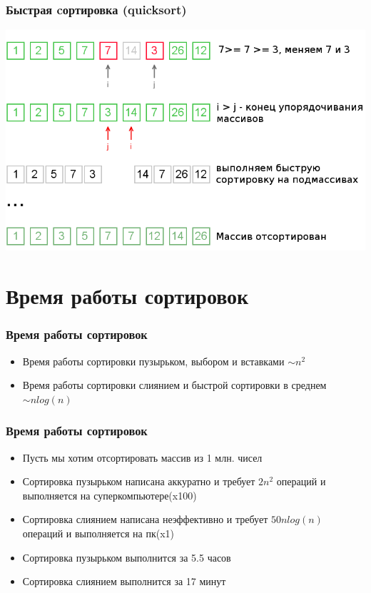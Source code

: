 \documentclass[12pt,pdf,hyperref={unicode}]{beamer}
\begin{document}
\begin{frame}[fragile]
\frametitle{Быстрая cортировка (quicksort)} 
\begin{center}
\includegraphics[width=0.9\linewidth]{images/qs2.png}
\end{center}
\end{frame}


\section{Время работы сортировок}

\begin{frame}[fragile]
\frametitle{Время работы сортировок} 
\begin{itemize}
\item Время работы сортировки пузырьком, выбором и вставками $\sim n^2$ \\
\item Время работы сортировки слиянием и быстрой сортировки в среднем $\sim n log(n)$ \\
\end{itemize}
\end{frame}

\begin{frame}[fragile]
\frametitle{Время работы сортировок} 
\begin{itemize}
\item Пусть мы хотим отсортировать массив из 1 млн. чисел
\item Сортировка пузырьком написана аккуратно и требует $2n^2$ операций и выполняется на суперкомпьютере(x100)
\item Сортировка слиянием написана неэффективно и требует $50 n log(n)$ операций и выполняется на пк(x1)
\item Сортировка пузырьком выполнится за 5.5 часов \\
\item Сортировка слиянием выполнится за 17 минут \\
\end{itemize}
\end{frame}
\end{document}
